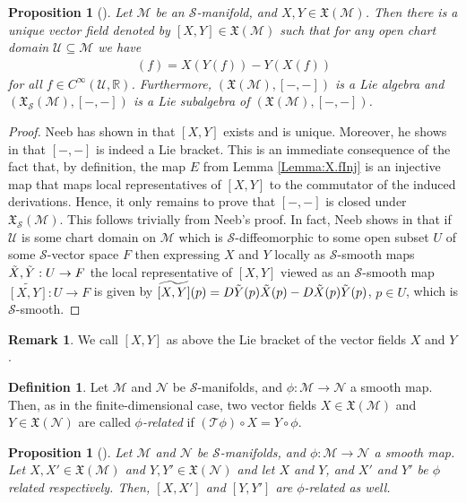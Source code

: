 \documentclass[12pt,a4paper]{article}
\theoremstyle{plain}
\newtheorem{proposition}[theorem]{Proposition}
\theoremstyle{definition}
\newtheorem{definition}[theorem]{Definition}
\newtheorem{remark}[theorem]{Remark}
\newcommand{\R}{\mathbb{R}}
\newcommand{\Mcal}{\mathcal{M}}
\newcommand{\Ncal}{\mathcal{N}}
\newcommand{\Scal}{\mathcal{S}}
\newcommand{\Ucal}{\mathcal{U}}
\begin{document}
\begin{proposition}[{\cite[Lemma II.3.6 and Proposition II.3.7]{InfDimLieneeb}}]
Let $\Mcal$ be an $\Scal$-manifold, and $X,Y\in \mathfrak{X}(\Mcal)$. Then there is a unique vector field denoted by $[X,Y]\in \mathfrak{X}(\Mcal)$ such that for any open chart domain $\Ucal\subseteq \Mcal$ we have
\begin{align*}
    [X,Y](f)=X(Y(f))-Y(X(f))
\end{align*}
for all $f\in C^\infty(\Ucal,\R)$. Furthermore, $(\mathfrak{X}(\Mcal),[-,-])$ is a Lie algebra and $(\mathfrak{X}_\Scal(\Mcal),[-,-])$ is a Lie subalgebra of $(\mathfrak{X}(\Mcal),[-,-])$.
\end{proposition}
\begin{proof}
Neeb has shown in \cite[Lemma II.3.6]{InfDimLieneeb} that $[X,Y]$ exists and is unique. Moreover, he shows in \cite[Proposition II.3.7]{InfDimLieneeb} that $[-,-]$ is indeed a Lie bracket. This is an immediate consequence of the fact that, by definition, the map $E$ from Lemma \ref{Lemma:X.fInj} is an injective map that maps local representatives of $[X,Y]$ to the commutator of the induced derivations. Hence, it only remains to prove that $[-,-]$ is closed under $\mathfrak{X}_\Scal(\Mcal)$. This follows trivially from Neeb's proof. In fact, Neeb shows in \cite[Lemma II.3.6]{InfDimLieneeb} that if $\Ucal$ is some chart domain on $\Mcal$ which is $\Scal$-diffeomorphic to some open subset $U$ of some $\Scal$-vector space $F$ then expressing $X$ and $Y$ locally as $\Scal$-smooth maps $\Tilde{X},\Tilde{Y}:U\to F$ the local representative of $[X,Y]$ viewed as an $\Scal$-smooth map $\widetilde{[X,Y]}:U\to F$ is given by $\widetilde{[X,Y]}(p)=D\Tilde{Y}(p)\Tilde{X}(p)-D\Tilde{X}(p)\Tilde{Y}(p)$, $p\in U$, which is $\Scal$-smooth.
\end{proof}

\begin{remark}
\label{Rem:LieBraVFsLocConv}
We call $[X,Y]$ as above the Lie bracket of the vector fields $X$ and $Y$.
\end{remark}


\begin{definition}
Let $\Mcal$ and $\Ncal$ be $\Scal$-manifolds, and $\phi:\Mcal\to \Ncal$ a smooth map. Then, as in the finite-dimensional case, two vector fields $X\in\mathfrak{X}(\Mcal)$ and $Y\in\mathfrak{X}(\Ncal)$ are called \textit{$\phi$-related} if $(\mathcal{T}\phi) \circ X=Y\circ \phi$.
\end{definition}


\begin{proposition}[{\cite[Lemma II.3.8]{InfDimLieneeb}}]
\label{Prop:LieBraPhiRel}
Let $\Mcal$ and $\Ncal$ be $\Scal$-manifolds, and 
$\phi:\Mcal\to \Ncal$ a smooth map. Let $X,X'\in \mathfrak{X}(\Mcal)$ and $Y,Y'\in \mathfrak{X}(\Ncal)$ and let $X$ and $Y$, and $X'$ and $Y'$ be $\phi$ related respectively. Then, $[X,X']$ and $[Y,Y']$ are $\phi$-related as well.
\end{proposition}
\end{document}
